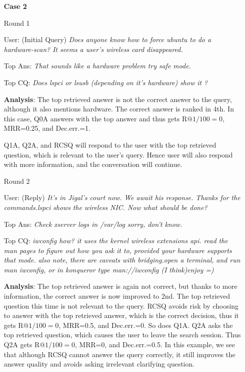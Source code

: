 \documentclass[format=acmsmall, review=False, screen=true]{acmart}
\begin{document}
\begin{itemize}
    \item[\textbf{Case 2}]
    \item[Round 1]
    \item[User:] (Initial Query) \textit{Does anyone know how to force ubuntu to do a hardware-scan? It seems a user's wireless card disappeared.}
    
    \item[Top Ans:] \textit{That sounds like a hardware problem try safe mode.}
    
    \item[Top CQ:] \textit{Does lspci or lsusb (depending on it's hardware) show it ?}

    \item[\textbf{Analysis}:]
    The top retrieved answer is not the correct answer to the query, although it also mentions hardware. The correct answer is ranked in 4th. In this case, Q0A answers with the top answer and thus gets $\text{R@1/100}=0$, MRR=0.25, and Dec.err.=1. 
    
    Q1A, Q2A, and RCSQ will respond to the user with the top retrieved question, which is relevant to the user's query. Hence user will also respond with more information, and the conversation will continue.
    
    \item[Round 2]
    \item[User:] (Reply) \textit{It's in Jigal's court now. We await his response. Thanks for the commands.lspci shows the wireless NIC. Now what should be done?}
    
    \item[Top Ans:] \textit{Check xserver logs in /var/log sorry, don't know.}
    
    \item[Top CQ:] \textit{iwconfig how? it uses the kernel wireless extensions api. read the man pages to figure out how you ask it to, provided your hardware supports that mode. also note, there are caveats with bridging.open a terminal, and run man iwconfig, or in konqueror type man://iwconfig (I think)enjoy =)}
    
     \item[\textbf{Analysis}:]
    The top retrieved answer is again not correct, but thanks to more information, the correct answer is now improved to 2nd. The top retrieved question this time is not relevant to the query. RCSQ avoids risk by choosing to answer with the top retrieved answer, which is the correct decision, thus it gets $\text{R@1/100}=0$, MRR=0.5, and Dec.err.=0. So does Q1A. Q2A asks the top retrieved question, which causes the user to leave the search session. Thus Q2A gets $\text{R@1/100}=0$, MRR=0, and Dec.err.=0.5. In this example, we see that although RCSQ cannot answer the query correctly, it still improves the answer quality and avoids asking irrelevant clarifying question.
\end{itemize}
\end{document}
